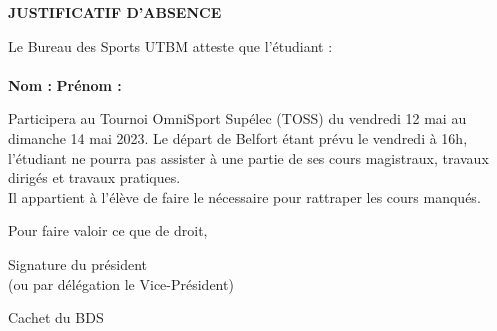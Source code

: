 \documentclass[11pt, a4paper]{article}
\begin{document}
\thispagestyle{fancy}

\begin{center}
    \bf \LARGE JUSTIFICATIF D'ABSENCE
\end{center}

\vspace{1cm}

Le Bureau des Sports UTBM atteste que l'étudiant :\\\\
\textbf{Nom :} \Surname \newline
\textbf{Prénom :} \Name \newline

Participera au Tournoi OmniSport Supélec (TOSS) du vendredi 12 mai au dimanche 14 mai 2023. Le départ de Belfort étant prévu le vendredi à 16h, l'étudiant ne pourra pas assister à une partie de ses cours magistraux, travaux dirigés et travaux pratiques.\\
Il appartient à l'élève de faire le nécessaire pour rattraper les cours manqués.

\vspace{1cm}

Pour faire valoir ce que de droit,

\vspace{0.6cm}

\begin{multicols}{2}
    Signature du président\\
(ou par délégation le Vice-Président)

\begin{flushright}
    Cachet du BDS
\end{flushright}

\end{multicols}
\end{document}
